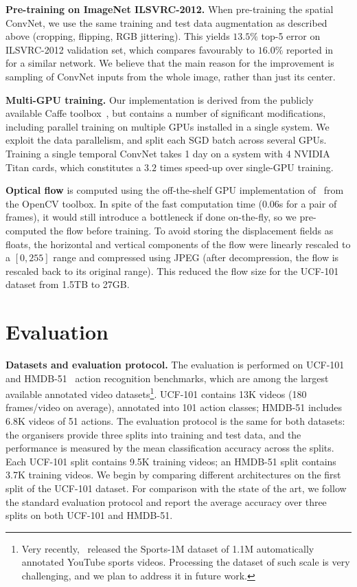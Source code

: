 \documentclass{article} \usepackage{nips14submit_e,times}
\begin{document}
\noindent\textbf{Pre-training on ImageNet ILSVRC-2012.}
When pre-training the spatial ConvNet, we use the same training and test data augmentation as described above (cropping, flipping, RGB jittering). 
This yields $13.5\%$ top-5 error on ILSVRC-2012 validation set, which compares favourably to $16.0\%$ reported in~\cite{Zeiler13} for a similar network. 
We believe that the main reason for the improvement is sampling of ConvNet inputs from the whole image, rather than just its center.

\noindent\textbf{Multi-GPU training.}
Our implementation is derived from the publicly available Caffe toolbox~\cite{Jia13}, but contains a number of significant modifications, including parallel 
training on multiple GPUs installed in a single system. We exploit the data parallelism, and split each SGD batch across several GPUs.
Training a single temporal ConvNet takes 1 day on a system with 4 NVIDIA Titan cards, which constitutes a $3.2$ times speed-up over single-GPU training.

\noindent\textbf{Optical flow} is computed using the off-the-shelf GPU implementation of~\cite{Brox04} from the OpenCV toolbox.
In spite of the fast computation time ($0.06$s for a pair of frames), it would still introduce a bottleneck if done on-the-fly, 
so we pre-computed the flow before training. To avoid storing the displacement fields as floats, the horizontal and vertical components of the flow were 
linearly rescaled to a $[0,255]$ range and compressed using JPEG (after decompression, the flow is rescaled back to its original range).
This reduced the flow size for the UCF-101 dataset from 1.5TB to 27GB.

\section{Evaluation}
\label{sec:eval}
\noindent\textbf{Datasets and evaluation protocol.}
The evaluation is performed on UCF-101~\cite{Soomro12} and \mbox{HMDB-51}~\cite{Kuehne11} action recognition benchmarks, which are among the largest available annotated video
datasets\footnote{Very recently,~\cite{Karpathy14} released the Sports-1M dataset of 1.1M automatically annotated YouTube sports videos. 
Processing the dataset of such scale is very challenging, and we plan to address it in future work.}. 
UCF-101 contains 13K videos (180 frames/video on average), annotated into 101 action classes; HMDB-51 includes 6.8K videos of 51 actions. 
The evaluation protocol is the same for both datasets: the organisers
provide three splits into training and test data, and the performance is measured by the mean classification accuracy across the splits. Each UCF-101 split contains 9.5K training
videos; an HMDB-51 split contains 3.7K training videos.
We begin by comparing different architectures on the first split of the UCF-101 dataset.
For comparison with the state of the art, we follow the standard evaluation protocol and report the average accuracy over three splits on both UCF-101 and HMDB-51. 
\end{document}
